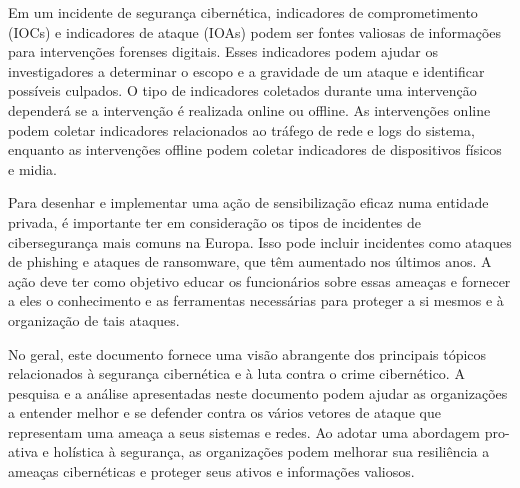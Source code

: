 Em um incidente de segurança cibernética, indicadores de comprometimento (IOCs) e indicadores de ataque (IOAs) podem ser fontes valiosas de informações para intervenções forenses digitais. Esses indicadores podem ajudar os investigadores a determinar o escopo e a gravidade de um ataque e identificar possíveis culpados. O tipo de indicadores coletados durante uma intervenção dependerá se a intervenção é realizada online ou offline. As intervenções online podem coletar indicadores relacionados ao tráfego de rede e logs do sistema, enquanto as intervenções offline podem coletar indicadores de dispositivos físicos e midia.

Para desenhar e implementar uma ação de sensibilização eficaz numa entidade privada, é importante ter em consideração os tipos de incidentes de cibersegurança mais comuns na Europa. Isso pode incluir incidentes como ataques de phishing e ataques de ransomware, que têm aumentado nos últimos anos. A ação deve ter como objetivo educar os funcionários sobre essas ameaças e fornecer a eles o conhecimento e as ferramentas necessárias para proteger a si mesmos e à organização de tais ataques.

No geral, este documento fornece uma visão abrangente dos principais tópicos relacionados à segurança cibernética e à luta contra o crime cibernético. A pesquisa e a análise apresentadas neste documento podem ajudar as organizações a entender melhor e se defender contra os vários vetores de ataque que representam uma ameaça a seus sistemas e redes. Ao adotar uma abordagem pro-ativa e holística à segurança, as organizações podem melhorar sua resiliência a ameaças cibernéticas e proteger seus ativos e informações valiosos.

\newpage
